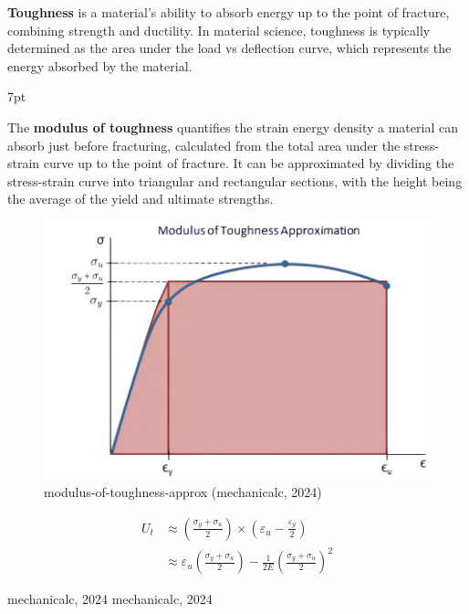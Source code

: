 \documentclass{article}
\newcommand{\formalsource}{} %
\newenvironment{formal}[1][]{%
    \renewcommand{\formalsource}{#1}%
    \def\FrameCommand{%
        \hspace{1pt}%
        {\color{gray}\vrule width 2pt}%
        {\color{white}\vrule width 4pt}%
        \colorbox{white}%
    }%
    \MakeFramed{\advance\hsize-\width\FrameRestore}%
    \noindent\hspace{-4.55pt}%
    \begin{adjustwidth}{}{7pt}%
        \vspace{2pt}%
    }%
    {%
        \vspace{4pt}%
        \ifx\formalsource\empty %
        \else
        \hfill{\footnotesize{\formalsource}}%
        \fi
    \end{adjustwidth}\endMakeFramed%
}
\begin{document}
{\textbf{Toughness} is a material's ability to absorb energy up to the point of fracture, combining strength and ductility. In material science, toughness is typically determined as the area under the load vs deflection curve, which represents the energy absorbed by the material.\\[8pt]
\begin{formal}[mechanicalc, 2024]
    The \textbf{modulus of toughness} quantifies the strain energy density a material can absorb just before fracturing, calculated from the total area under the stress-strain curve up to the point of fracture. It can be approximated by dividing the stress-strain curve into triangular and rectangular sections, with the height being the average of the yield and ultimate strengths.
\begin{center}
    \begin{minipage}{0.5\textwidth}\centering
        \begin{figure}[H]
            \centering
            \includegraphics[width=1\textwidth]{images/modulus-of-toughness-approx-01(1).jpg}
            \caption{modulus-of-toughness-approx (mechanicalc, 2024)}
            \label{fig:mot}
        \end{figure}
    \end{minipage}\hfil
    \begin{minipage}{0.45\textwidth}
        \begin{equation}
            \begin{aligned}
                U_t &\approx \left(\frac{\sigma_{y} + \sigma_{u}}{2}\right)\times\left(\varepsilon_u - \frac{\varepsilon_y}{2}\right)\\
                &\approx \varepsilon_u\left(\frac{\sigma_{y} + \sigma_{u}}{2}\right) -\frac{1}{2E}\left(\frac{\sigma_{y} + \sigma_{u}}{2}\right)^2

\end{aligned}
\end{equation}
\end{minipage}
\end{center}
\end{formal}}
\end{document}
